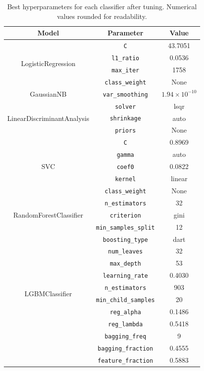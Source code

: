 \documentclass[12pt]{article}
\begin{document}
\begin{table}[H]
    \centering
    \begin{tabular}{|c|c|c|}
    \hline
    \textbf{Model} & \textbf{Parameter} & \textbf{Value} \\
    \hline
    \multirow{4}{*}{LogisticRegression}
      & \texttt{C} & 43.7051 \\
      & \texttt{l1\_ratio} & 0.0536 \\
      & \texttt{max\_iter} & 1758 \\
      & \texttt{class\_weight} & None \\
    \hline
    \multirow{1}{*}{GaussianNB}
      & \texttt{var\_smoothing} & $1.94 \times 10^{-10}$ \\
    \hline
    \multirow{3}{*}{LinearDiscriminantAnalysis}
      & \texttt{solver} & lsqr \\
      & \texttt{shrinkage} & auto \\
      & \texttt{priors} & None \\
    \hline
    \multirow{5}{*}{SVC}
      & \texttt{C} & 0.8969 \\
      & \texttt{gamma} & auto \\
      & \texttt{coef0} & 0.0822 \\
      & \texttt{kernel} & linear \\
      & \texttt{class\_weight} & None \\
    \hline
    \multirow{3}{*}{RandomForestClassifier}
      & \texttt{n\_estimators} & 32 \\
      & \texttt{criterion} & gini \\
      & \texttt{min\_samples\_split} & 12 \\
    \hline
    \multirow{10}{*}{LGBMClassifier}
      & \texttt{boosting\_type} & dart \\
      & \texttt{num\_leaves} & 32 \\
      & \texttt{max\_depth} & 53 \\
      & \texttt{learning\_rate} & 0.4030 \\
      & \texttt{n\_estimators} & 903 \\
      & \texttt{min\_child\_samples} & 20 \\
      & \texttt{reg\_alpha} & 0.1486 \\
      & \texttt{reg\_lambda} & 0.5418 \\
      & \texttt{bagging\_freq} & 9 \\
      & \texttt{bagging\_fraction} & 0.4555 \\
      & \texttt{feature\_fraction} & 0.5883 \\
    \hline
    \end{tabular}
    \caption{Best hyperparameters for each classifier after tuning. Numerical
    values rounded for readability.}
    \label{tab:hyperparams_models}
\end{table}
\end{document}
